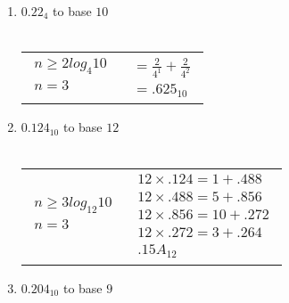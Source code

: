 \documentclass[12pt]{article}
\begin{document}
\begin{enumerate}
\begin{tabular}{l | l}
     \end{tabular}
     

     \item $0.22_{4}$ to base $10$ \\ \\
     \begin{tabular}{l | l}

        $\begin{aligned}
            n \geq 2log_{4}10 \\
            n = 3 \\
        \end{aligned}$

        &

        $\begin{aligned}
            = \frac{2}{4^1} + \frac{2}{4^2} \\
            = \boxed{.625_{10}}
        \end{aligned}$

     \end{tabular}
     

     \item $0.124_{10}$ to base $12$ \\ \\
     \begin{tabular}{l | l}

        $\begin{aligned}
            n \geq 3log_{12}10 \\
            n = 3 \\
        \end{aligned}$

        &

        $\begin{aligned}
            12 \times .124 = 1 + .488 \\
            12 \times .488 = 5 + .856 \\
            12 \times .856 = 10 + .272 \\
            12 \times .272 = 3 + .264 \\
            \boxed{.15A_{12}}
        \end{aligned}$

     \end{tabular}
     

     \item $0.204_{10}$ to base $9$ \\ \\
     \begin{tabular}{l | l}


\end{tabular}
\end{enumerate}
\end{document}
